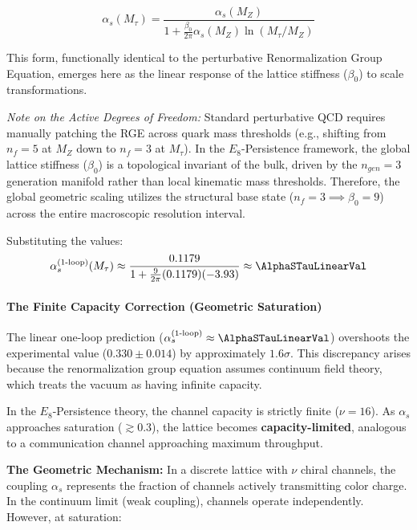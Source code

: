 \begin{equation}
\alpha_s(M_\tau) = \frac{\alpha_s(M_Z)}{1 + \frac{\beta_0}{2\pi} \alpha_s(M_Z) \ln(M_\tau/M_Z)}
\end{equation}

This form, functionally identical to the perturbative Renormalization Group Equation, emerges here as the linear response of the lattice stiffness ($\beta_0$) to scale transformations.

\textit{Note on the Active Degrees of Freedom:} Standard perturbative QCD requires manually patching the RGE across quark mass thresholds (e.g., shifting from $n_f=5$ at $M_Z$ down to $n_f=3$ at $M_\tau$). In the $E_8$-Persistence framework, the global lattice stiffness ($\beta_0$) is a topological invariant of the bulk, driven by the $n_{gen}=3$ generation manifold rather than local kinematic mass thresholds. Therefore, the global geometric scaling utilizes the structural base state ($n_f = 3 \implies \beta_0 = 9$) across the entire macroscopic resolution interval. 

Substituting the values:
\begin{equation}
\alpha_s^{\text{(1-loop)}}(M_\tau) \approx \frac{0.1179}{1 + \frac{9}{2\pi}(0.1179)(-3.93)} \approx \AlphaSTauLinearVal
\end{equation}




\paragraph{The Finite Capacity Correction (Geometric Saturation)}
The linear one-loop prediction ($\alpha_s^{\text{(1-loop)}} \approx \AlphaSTauLinearVal$) overshoots the experimental value ($0.330 \pm 0.014$) by approximately $1.6\sigma$. This discrepancy arises because the renormalization group equation assumes continuum field theory, which treats the vacuum as having infinite capacity.

In the $E_8$-Persistence theory, the channel capacity is strictly finite ($\nu=16$). As $\alpha_s$ approaches saturation ($\gtrsim 0.3$), the lattice becomes \textbf{capacity-limited}, analogous to a communication channel approaching maximum throughput.

\textbf{The Geometric Mechanism:}
In a discrete lattice with $\nu$ chiral channels, the coupling $\alpha_s$ represents the fraction of channels actively transmitting color charge. In the continuum limit (weak coupling), channels operate independently. However, at saturation:

